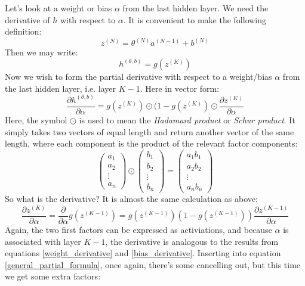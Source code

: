 \documentclass[12pt, a4paper]{article}
\numberwithin{equation}{section}
\begin{document}
Let's look at a weight or bias $\alpha$ from the last hidden layer. We need the derivative of $h$ with respect to $\alpha$. It is convenient to make the following definition:
\begin{equation}
z^{(N)}=\theta^{(N)}a^{(N-1)}+b^{(N)}
\end{equation}
Then we may write:
\begin{equation}
h^{(\theta,b)}=g(z^{(K)})
\end{equation}
Now we wish to form the partial derivative with respect to a weight/bias $\alpha$ from the last hidden layer, i.e. layer $K-1$. Here in vector form:
\begin{equation}
\frac{\partial h^{(\theta,b)}}{\partial\alpha}=g(z^{(K)})\odot(1-g(z^{(K)})\odot\frac{\partial z^{(K)}}{\partial\alpha}
\end{equation}
Here, the symbol $\odot$ is used to mean the \textit{Hadamard product} or \textit{Schur product}. It simply takes two vectors of equal length and return another vector of the same length, where each component is the product of the relevant factor components:
\begin{equation}
\begin{pmatrix}
a_1 \\ a_2 \\ \vdots \\ a_n
\end{pmatrix}
\odot
\begin{pmatrix}
b_1 \\ b_2 \\ \vdots \\ b_n
\end{pmatrix}
=
\begin{pmatrix}
a_1 b_1 \\ a_2 b_2 \\ \vdots \\ a_n b_n
\end{pmatrix}
\end{equation}
So what is the derivative? It is almost the same calculation as above:
\begin{equation}
\frac{\partial z^{(K)}}{\partial\alpha}=\frac{\partial}{\partial\alpha}g(z^{(K-1)})=g(z^{(K-1)})(1-g(z^{(K-1)}))\frac{\partial z^{(K-1)}}{\partial\alpha}
\end{equation}
Again, the two first factors can be expressed as activiations, and because $\alpha$ is associated with layer $K-1$, the derivative is analogous to the results from equations \ref{weight_derivative} and \ref{bias_derivative}. Inserting into equation \ref{general_partial_formula}, once again, there's some cancelling out, but this time we get some extra factors:
\end{document}
